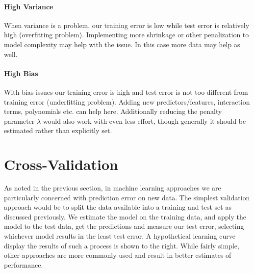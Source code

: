 \documentclass[english,nohyper,titlepage]{tufte-handout}\usepackage{knitr}
\begin{document}
\subsection{High Variance}
When variance is a problem, our training error is low while test error is relatively high (overfitting problem). Implementing more shrinkage or other penalization to model complexity may help with the issue.  In this case more data may help as well.

\subsection{High Bias}
With bias issues our training error is high and test error is not too different from training error (underfitting problem).  Adding new predictors/features, interaction terms, polynomials etc. can help here.  Additionally reducing the penalty parameter $\lambda$ would also work with even less effort, though generally it should be estimated rather than explicitly set.







\part{Cross-Validation}
As noted in the previous section, in machine learning approaches we are particularly concerned with prediction error on new data.  The simplest validation approach would be to split the data available into a training and test set as discussed previously.  We estimate the model on the training data, and apply the model to the test data, get the predictions and measure our test error, selecting whichever model results in the least test error.  A hypothetical learning curve display the results of such a process is shown to the right. While fairly simple, other approaches are more commonly used and result in better estimates of performance.
\end{document}
